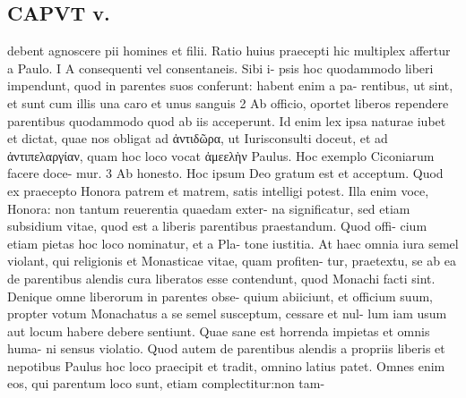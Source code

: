 \documentclass{article}
\begin{document}
\begin{pages}
\section*{CAPVT  v. }
\marginpar{[ p.255 ]}debent agnoscere pii homines et filii. Ratio huius praecepti hic multiplex affertur a Paulo. I A consequenti vel consentaneis. Sibi i- psis hoc quodammodo liberi impendunt, quod in parentes suos conferunt: habent enim a pa- rentibus, ut sint, et sunt cum illis una caro et unus sanguis 2 Ab officio, oportet liberos rependere parentibus quodammodo quod ab iis acceperunt. Id enim lex ipsa naturae iubet et dictat, quae nos obligat ad ἀντιδῶρα, ut Iurisconsulti doceut, et ad ἀντιπελαργίαν, quam hoc loco vocat ἀμεελὴν Paulus. Hoc exemplo Ciconiarum facere doce- mur. 3 Ab honesto. Hoc ipsum Deo gratum est et acceptum. Quod ex praecepto Honora patrem et matrem, satis intelligi potest. Illa enim voce, Honora: non tantum reuerentia quaedam exter- na significatur, sed etiam subsidium vitae, quod est a liberis parentibus praestandum. Quod offi- cium etiam pietas hoc loco nominatur, et a Pla- tone iustitia. At haec omnia iura semel violant, qui religionis et Monasticae vitae, quam profiten- tur, praetextu, se ab ea de parentibus alendis cura liberatos esse contendunt, quod Monachi facti sint. Denique omne liberorum in parentes obse- quium abiiciunt, et officium suum, propter votum Monachatus a se semel susceptum, cessare et nul- lum iam usum aut locum habere debere sentiunt. Quae sane est horrenda impietas et omnis huma- ni sensus violatio. Quod autem de parentibus alendis a propriis liberis et nepotibus Paulus hoc loco praecipit et tradit, omnino latius patet. Omnes enim eos, qui parentum loco sunt, etiam complectitur:non tam- 

\end{pages}
\end{document}
